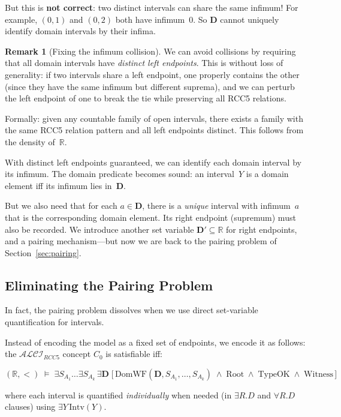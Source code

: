 \documentclass[a4paper,11pt]{article}
\theoremstyle{definition}
\newtheorem{remark}[theorem]{Remark}
\newcommand{\ALCIRCC}[1]{\ensuremath{\mathcal{ALCI}_{\mathit{RCC#1}}}}
\newcommand{\reals}{\ensuremath{\mathbb{R}}}
\begin{document}
But this is \textbf{not correct}: two distinct intervals can share
the same infimum!  For example, $(0, 1)$ and $(0, 2)$ both have
infimum~$0$.  So $\mathbf{D}$ cannot uniquely identify domain
intervals by their infima.

\begin{remark}[Fixing the infimum collision]
We can avoid collisions by requiring that all domain intervals have
\emph{distinct left endpoints}.  This is without loss of generality:
if two intervals share a left endpoint, one properly contains the
other (since they have the same infimum but different suprema), and
we can perturb the left endpoint of one to break the tie while
preserving all RCC5 relations.

Formally: given any countable family of open intervals, there exists
a family with the same RCC5 relation pattern and all left endpoints
distinct.  This follows from the density of~$\reals$.
\end{remark}

With distinct left endpoints guaranteed, we can identify each domain
interval by its infimum.  The domain predicate becomes sound: an
interval~$Y$ is a domain element iff its infimum lies
in~$\mathbf{D}$.

But we also need that for each $a \in \mathbf{D}$, there is a
\emph{unique} interval with infimum~$a$ that is the corresponding
domain element.  Its right endpoint (supremum) must also be recorded.
We introduce another set variable $\mathbf{D'} \subseteq \reals$
for right endpoints, and a pairing mechanism---but now we are back
to the pairing problem of Section~\ref{sec:pairing}.

\subsection{Eliminating the Pairing Problem}
\label{sec:no-pairing}

In fact, the pairing problem dissolves when we use direct set-variable
quantification for intervals.

Instead of encoding the model as a fixed set of endpoints, we encode
it as follows: the $\ALCIRCC{5}$ concept $C_0$ is satisfiable iff:

\[
  (\reals, <) \;\models\; \exists S_{A_1} \ldots \exists S_{A_k}\,
  \exists \mathbf{D}\;
  \bigl[\,\mathrm{DomWF}(\mathbf{D}, S_{A_1}, \ldots, S_{A_k})
  \;\land\; \mathrm{Root}
  \;\land\; \mathrm{TypeOK} \;\land\; \mathrm{Witness}\,\bigr]
\]

where each interval is quantified \emph{individually} when needed
(in $\exists R.D$ and $\forall R.D$ clauses) using $\exists Y\,
\mathrm{Intv}(Y)$.
\end{document}
